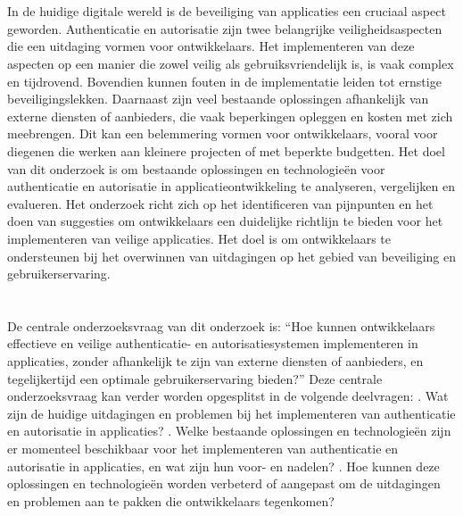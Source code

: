 \section{}%
\label{sec:probleemstelling}
In de huidige digitale wereld is de beveiliging van applicaties een cruciaal aspect geworden. Authenticatie en autorisatie zijn twee belangrijke veiligheidsaspecten die een uitdaging vormen voor ontwikkelaars. 
Het implementeren van deze aspecten op een manier die zowel veilig als gebruiksvriendelijk is, is vaak complex en tijdrovend. Bovendien kunnen fouten in de implementatie leiden tot ernstige beveiligingslekken. 
\newline
Daarnaast zijn veel bestaande oplossingen afhankelijk van externe diensten of aanbieders, die vaak beperkingen opleggen en kosten met zich meebrengen. Dit kan een belemmering vormen voor ontwikkelaars, 
vooral voor diegenen die werken aan kleinere projecten of met beperkte budgetten.
\newline
Het doel van dit onderzoek is om bestaande oplossingen en technologieën voor authenticatie en autorisatie in applicatieontwikkeling te analyseren, vergelijken en evalueren. 
Het onderzoek richt zich op het identificeren van pijnpunten en het doen van suggesties om ontwikkelaars een duidelijke richtlijn te bieden voor het implementeren van veilige applicaties. 
Het doel is om ontwikkelaars te ondersteunen bij het overwinnen van uitdagingen op het gebied van beveiliging en gebruikerservaring.

\section{}%
\label{sec:onderzoeksvraag}

De centrale onderzoeksvraag van dit onderzoek is: ``Hoe kunnen ontwikkelaars effectieve en veilige authenticatie- en autorisatiesystemen implementeren in applicaties, zonder afhankelijk te zijn van 
externe diensten of aanbieders, en tegelijkertijd een optimale gebruikerservaring bieden?''
\newline
\newline
Deze centrale onderzoeksvraag kan verder worden opgesplitst in de volgende deelvragen:
\newline
{}. Wat zijn de huidige uitdagingen en problemen bij het implementeren van authenticatie en autorisatie in applicaties?
. Welke bestaande oplossingen en technologieën zijn er momenteel beschikbaar voor het implementeren van authenticatie en autorisatie in applicaties, en wat zijn hun voor- en nadelen?
. Hoe kunnen deze oplossingen en technologieën worden verbeterd of aangepast om de uitdagingen en problemen aan te pakken die ontwikkelaars tegenkomen?


